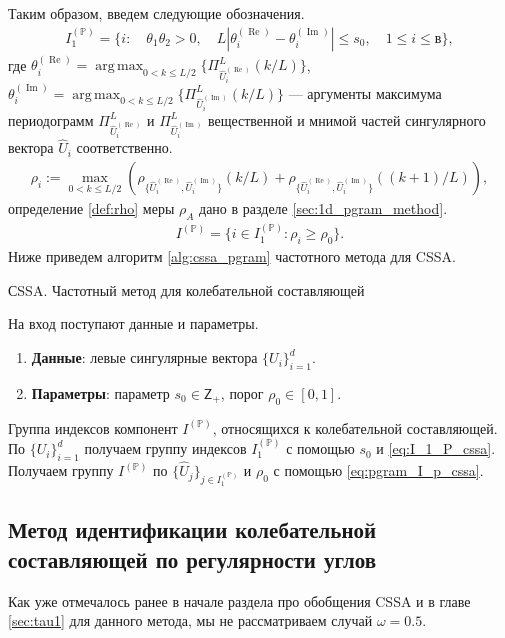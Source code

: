 \documentclass[specialist,
               substylefile = spbu.rtx,
               subf,href,colorlinks=true, 12pt]{disser}
\def\RE{\mathop{\mathrm{Re}}}
\def\argmax{\mathop{\mathrm{argmax}}}
\def\IM{\mathop{\mathrm{Im}}}
\def\argmax{\mathop{\mathrm{arg\,max}}}
\begin{document}
 
Таким образом, введем следующие обозначения.  
\begin{gather} \label{eq:I_1_P_cssa}
I_1^{(\mathbb{P})} = \{ i: \quad \theta_1 \theta_2 >0, \quad L |\theta_i^{(\RE)} - \theta_{i}^{(\IM)}| \leqslant s_0, \quad 1 \leqslant i \leqslant в  \},
\end{gather}
где $\theta_i^{(\RE)} = \argmax_{0 < k \leqslant L/2} \{\Pi_{\widehat{U}^{(\RE)}_{i}}^L(k/L)\}$, $\theta_{i}^{(\IM)} = \argmax_{0 < k \leqslant L/2} \{\Pi_{\widehat{U}^{(\IM)}_{i}}^L(k/L)\}$ --- аргументы максимума периодограмм $\Pi_{\widehat{U}^{(\RE)}_{i}}^L$ и $\Pi_{\widehat{U}^{(\IM)}_{i}}^L$ вещественной и мнимой частей сингулярного вектора $\widehat{U}_i$ соответственно.
\begin{gather} \label{eq:rho_i_cssa}
\rho_{i} := \max_{0 < k \leqslant L/2}{\left(\rho_{\{\widehat{U}^{(\RE)}_{i},\widehat{U}^{(\IM)}_{i}\}}(k/L) + \rho_{\{\widehat{U}^{(\RE)}_{i},\widehat{U}^{(\IM)}_{i}\}}((k+1)/L)\right)},
\end{gather}
определение \ref{def:rho} меры $\rho_A$ дано в разделе \ref{sec:1d_pgram_method}.
\begin{gather} \label{eq:pgram_I_p_cssa}
I^{(\mathbb{P})} = \{ i \in I_1^{(\mathbb{P})}: \rho_{i} \geqslant\rho_0 \}.
\end{gather}
Ниже приведем алгоритм \ref{alg:cssa_pgram} частотного метода для CSSA.
\begin{algorithm}[!hhh]
\caption{СSSA. Частотный метод для колебательной составляющей}
\label{alg:cssa_pgram}
\begin{algorithmic}[1]
\REQUIRE На вход поступают данные и параметры.
\begin{enumerate}
\item \textbf{Данные}: левые сингулярные вектора $\{U_i\}_{i=1}^{d}$.
\item \textbf{Параметры}: параметр $s_0 \in \mathsf{Z}_{+}$, порог $\rho_0 \in [0,1]$.
\end{enumerate}
\ENSURE Группа индексов компонент $I^{(\mathbb{P})}$, относящихся к колебательной составляющей.
\STATE  По $\{U_i\}_{i=1}^{d}$ получаем группу индексов $I_1^{(\mathbb{P})}$ с помощью $s_0$ и \eqref{eq:I_1_P_cssa}.
\STATE Получаем группу $I^{(\mathbb{P})}$ по $\{\widehat{U}_j\}_{j \in I_1^{(\mathbb{P})}}$ и $\rho_0$ с помощью \eqref{eq:pgram_I_p_cssa}.
\end{algorithmic}
\end{algorithm}


\subsection{Метод идентификации колебательной составляющей по регулярности углов}
\label{sec:tau_cssa}
Как уже отмечалось ранее в начале раздела про обобщения CSSA и в главе \ref{sec:tau1} для данного метода, мы не рассматриваем случай $\omega=0.5$.
\end{document}
